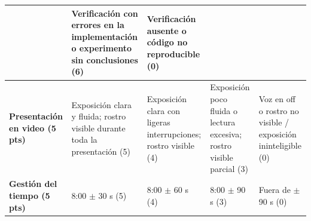 \documentclass[a4,11pt]{aleph-notas}
\begin{document}
\begin{landscape}
\begin{center}
\begin{tabular}{p{5cm}p{4cm}p{4cm}p{4cm}p{4cm}}
    & Verificación con errores en la implementación o experimento sin conclusiones (6)
    & Verificación ausente o código no reproducible (0) \\ \midrule
\textbf{Presentación en video (5 pts)}
    & Exposición clara y fluida; rostro visible durante toda la presentación (5)
    & Exposición clara con ligeras interrupciones; rostro visible (4)
    & Exposición poco fluida o lectura excesiva; rostro visible parcial (3)
    & Voz en off o rostro no visible / exposición ininteligible (0) \\ \midrule
\textbf{Gestión del tiempo (5 pts)}
    & 8:00 $\pm$ 30 s (5)
    & 8:00 $\pm$ 60 s (4)
    & 8:00 $\pm$ 90 s (3)
    & Fuera de $\pm$ 90 s (0) \\ \bottomrule
\end{tabular}
\end{center}
\end{landscape}
\end{document}
